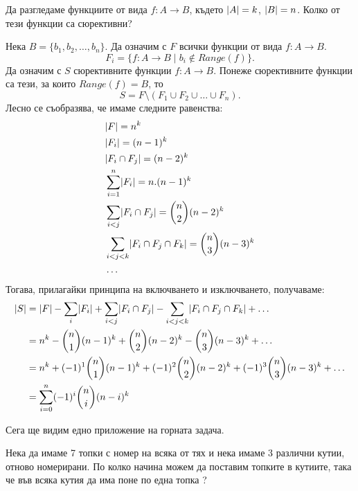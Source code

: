 \begin{problem}
  Да разгледаме функциите от вида $f:A\to B$, където $\lvert{A}\rvert = k$, $\lvert{B}\rvert = n$.
  Колко от тези функции са сюрективни?
\end{problem}
\begin{solution}
  Нека $B = \{b_1,b_2,\dots,b_n\}$.
  Да означим с $F$ всички функции от вида $f:A\to B$.
  \[F_i = \{f:A\to B\mid b_i \not\in Range(f)\}.\]
  Да означим с $S$ сюрективните функции $f:A\to B$.
  Понеже сюрективните функции са тези, за които $Range(f) = B$, то
  \[S = F\setminus(F_1\cup F_2 \cup \dots \cup F_n).\]
  Лесно се съобразява, че имаме следните равенства:
  \begin{align*}
    & \lvert{F}\rvert = n^k\\
    & \lvert{F_i}\rvert = (n-1)^k\\
    & \lvert{F_i \cap F_j}\rvert = (n-2)^k\\
    & \sum^n_{i=1}\lvert{F_i}\rvert = n.(n-1)^k\\
    & \sum_{i < j}\lvert{F_i \cap F_j}\rvert = \binom{n}{2}(n-2)^k\\
    & \sum_{i < j < k}\lvert{F_i \cap F_j \cap F_k}\rvert = \binom{n}{3}(n-3)^k\\
    & \dots
  \end{align*}
  Тогава, прилагайки принципа на включването и изключването, получаваме:
  \begin{align*}
    \lvert{S}\rvert & = \lvert{F}\rvert - \sum_i \lvert{F_i}\rvert + \sum_{i < j}\lvert{F_i\cap F_j}\rvert - \sum_{i < j < k}\lvert{F_i \cap F_j \cap F_k}\rvert + \dots \\
    & = n^k - \binom{n}{1}(n-1)^k + \binom{n}{2}(n-2)^k - \binom{n}{3}(n-3)^k + \dots\\
    & = n^k + (-1)^1\binom{n}{1}(n-1)^k + (-1)^2\binom{n}{2}(n-2)^k + (-1)^3\binom{n}{3}(n-3)^k + \dots\\
    & = \sum^n_{i=0}(-1)^i\binom{n}{i}(n-i)^k
  \end{align*}
\end{solution}

Сега ще видим едно приложение на горната задача.

\begin{problem}
  Нека да имаме 7 топки с номер на всяка от тях и нека имаме 3 различни кутии, отново номерирани.
  По колко начина можем да поставим топките в кутиите, така че във всяка кутия да има поне по една топка ?
\end{problem}

